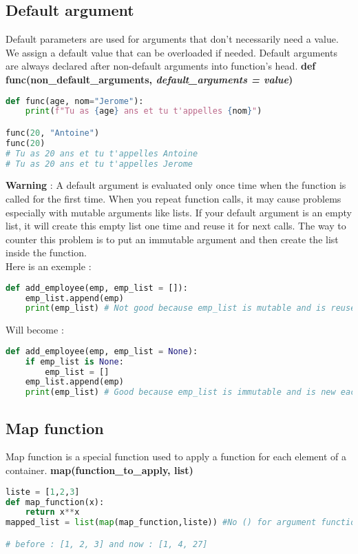 \documentclass[a4paper, 12pt, titlepage]{scrartcl} %
\begin{document}
\subsection{Default argument}
Default parameters are used for arguments that don't necessarily need a value. We assign a default value that can be overloaded if needed. Default arguments are always declared after non-default arguments into function's head. \textbf{def func(non\_default\_arguments, \textit{default\_arguments = value})}

\begin{lstlisting}[language=Python]
def func(age, nom="Jerome"):
	print(f"Tu as {age} ans et tu t'appelles {nom}")

func(20, "Antoine")
func(20)
# Tu as 20 ans et tu t'appelles Antoine
# Tu as 20 ans et tu t'appelles Jerome
\end{lstlisting}

\textbf{Warning} : A default argument is evaluated only once time when the function is called for the first time. When you repeat function calls, it may cause problems especially with mutable arguments like lists. If your default argument is an empty list, it will create this empty list one time and reuse it for next calls. The way to counter this problem is to put an immutable argument and then create the list inside the function. \\
Here is an exemple : 
\begin{lstlisting}[language=Python]
def add_employee(emp, emp_list = []):
    emp_list.append(emp)
    print(emp_list) # Not good because emp_list is mutable and is reused each time this function is called.
\end{lstlisting}
Will become :
\begin{lstlisting}[language=Python]
def add_employee(emp, emp_list = None):
    if emp_list is None:
        emp_list = []
    emp_list.append(emp)
    print(emp_list) # Good because emp_list is immutable and is new each time this function is called.
\end{lstlisting}


\subsection{Map function}
Map function is a special function used to apply a function for each element of a container. \textbf{map(function\_to\_apply, list)}
\begin{lstlisting}[language=Python]
liste = [1,2,3]
def map_function(x):
	return x**x
mapped_list = list(map(map_function,liste)) #No () for argument function

# before : [1, 2, 3] and now : [1, 4, 27]
\end{lstlisting}
\end{document}
